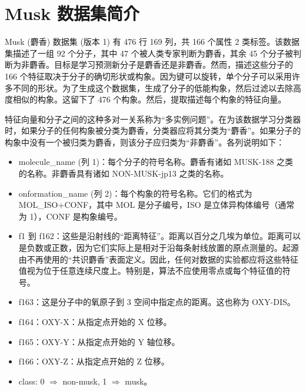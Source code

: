 \documentclass[12pt,AutoFakeBold]{article}
\begin{document}
\maketitle
\setcounter{tocdepth}{2}

\tableofcontents  %

\makeatletter
\begin{center}
    \LARGE \textbf{\textsf{\@problem}}
\end{center}
\makeatother


\section{Musk 数据集简介}

Musk (麝香) 数据集 (版本 1) 有 476 行 169 列，共 166 个属性 2 类标签。该数据集描述了一组 92 个分子，其中 47 个被人类专家判断为麝香，其余 45 个分子被判断为非麝香。目标是学习预测新分子是麝香还是非麝香。然而，描述这些分子的 166 个特征取决于分子的确切形状或构象。因为键可以旋转，单个分子可以采用许多不同的形状。为了生成这个数据集，生成了分子的低能构象，然后过滤以去除高度相似的构象。这留下了 476 个构象。然后，提取描述每个构象的特征向量。

特征向量和分子之间的这种多对一关系称为“多实例问题”。在为该数据学习分类器时，如果分子的任何构象被分类为麝香，分类器应将其分类为“麝香”。如果分子的构象中没有一个被归类为麝香，则该分子应归类为“非麝香”。各列说明如下：

\begin{itemize}
\item 	
molecule\_name (列 1)：每个分子的符号名称。麝香有诸如 MUSK-188 之类的名称。非麝香具有诸如 NON-MUSK-jp13 之类的名称。
\item onformation\_name (列 2)：每个构象的符号名称。它们的格式为 MOL\_ISO+CONF，其中 MOL 是分子编号，ISO 是立体异构体编号（通常为 1），CONF 是构象编号。
\item f1 到 f162：这些是沿射线的“距离特征”。距离以百分之几埃为单位。距离可以是负数或正数，因为它们实际上是相对于沿每条射线放置的原点测量的。起源由不再使用的“共识麝香”表面定义。因此，任何对数据的实验都应将这些特征值视为位于任意连续尺度上。特别是，算法不应使用零点或每个特征值的符号。
\item f163：这是分子中的氧原子到 3 空间中指定点的距离。这也称为 OXY-DIS。
\item f164：OXY-X：从指定点开始的 X 位移。
\item f165：OXY-Y：从指定点开始的 Y 轴位移。
\item f166：OXY-Z：从指定点开始的 Z 位移。
\item class: 0 $\Rightarrow$ non-musk, 1 $\Rightarrow$ musk。
\end{itemize}
\end{document}
